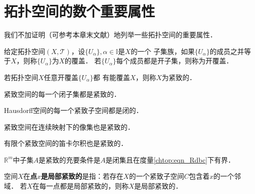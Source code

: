 \section{拓扑空间的数个重要属性}
我们不加证明（可参考本章末文献）地列举一些拓扑空间的重要属性．


\begin{definition}\label{chtop:def_covering}
    给定拓扑空间$(X,\mathscr{T})$，设$\{U_\alpha\}, \alpha\in \mathbb{I}$是$X$的一个
    子集族，如果$\{U_\alpha\}$的成员之并等于$X$，则称$\{U_\alpha\}$为$X$的{\heiti 覆盖}．
    若$\{U_\alpha\}$每个成员都是开子集，则称为{\heiti 开覆盖}．
\end{definition}

\begin{definition}\label{chtop:def_compact}
    若拓扑空间$X$任意开覆盖$\{U_\alpha\}$都
    有能覆盖$X$，则称$X$为{\heiti 紧致的}．
\end{definition}



\begin{proposition}
    紧致空间的每一个闭子集都是紧致的．
\end{proposition}


\begin{proposition}
    Hausdorff空间的每一个紧致子空间都是闭的．
\end{proposition}


\begin{proposition}
    紧致空间在连续映射下的像集也是紧致的．
\end{proposition}

\begin{proposition}
    有限个紧致空间的笛卡尔积也是紧致的．
\end{proposition}


\begin{proposition}
    $\mathbb{R}^m$中子集$A$是紧致的充要条件是$A$是闭集且在度量\eqref{chtop:eqn_Rdbc}下有界．
\end{proposition}

\begin{definition}
    空间$X$在{\heiti\bfseries 点$x$是局部紧致的}是指：若存在$X$的一个紧致子空间$C$包含着$x$的一个邻域．
    若$X$在每一点都是局部紧致的，则称$X$是{\heiti 局部紧致的}．
\end{definition}


